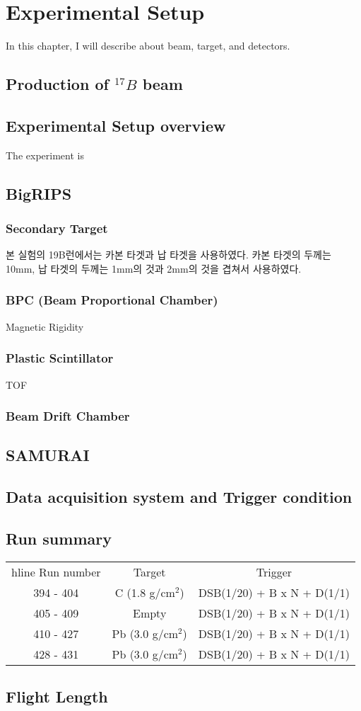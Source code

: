 \chapter{Experimental Setup}
In this chapter, I will describe about beam, target, and detectors. 
\section{Production of  ${}^{17}B$ beam}

\section{Experimental Setup overview}
The experiment is 
\section{BigRIPS}
\subsection{Secondary Target}
본 실험의 19B런에서는 카본 타겟과 납 타겟을 사용하였다. 카본 타겟의 두께는 10mm, 납 타겟의 두께는 1mm의 것과 2mm의 것을 겹쳐서 사용하였다. 
\subsection{BPC (Beam Proportional Chamber)}
Magnetic Rigidity 
\subsection{Plastic Scintillator}
TOF
\subsection{Beam Drift Chamber}


\section{SAMURAI}
\section{Data acquisition system and Trigger condition}
\section{Run summary}
\begin{center}
    \begin{tabular}[h]{ccc}
         hline
        Run number& Target & Trigger \\
        394 - 404 &  C (1.8 g/cm${}^{2}$)  & DSB(1/20) + B x N + D(1/1)\\
        405 - 409 &  Empty  & DSB(1/20) + B x N + D(1/1)\\
        410 - 427 &  Pb (3.0 g/cm${}^{2}$)  & DSB(1/20) + B x N + D(1/1)\\
        428 - 431 & Pb (3.0 g/cm${}^{2}$)  & DSB(1/20) + B x N + D(1/1)\\
    \end{tabular}
\end{center}

\section{Flight Length}